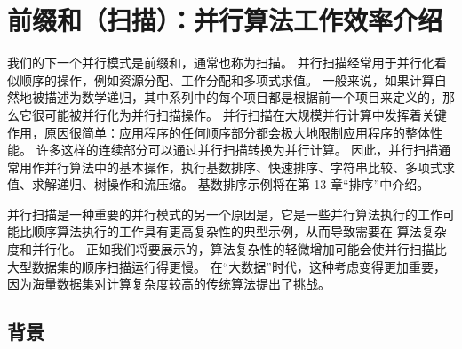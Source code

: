 \section{前缀和（扫描）：并行算法工作效率介绍}
我们的下一个并行模式是前缀和，通常也称为扫描。 并行扫描经常用于并行化看似顺序的操作，例如资源分配、工作分配和多项式求值。 一般来说，如果计算自然地被描述为数学递归，其中系列中的每个项目都是根据前一个项目来定义的，那么它很可能被并行化为并行扫描操作。 并行扫描在大规模并行计算中发挥着关键作用，原因很简单：应用程序的任何顺序部分都会极大地限制应用程序的整体性能。 许多这样的连续部分可以通过并行扫描转换为并行计算。 因此，并行扫描通常用作并行算法中的基本操作，执行基数排序、快速排序、字符串比较、多项式求值、求解递归、树操作和流压缩。 基数排序示例将在第 13 章“排序”中介绍。

并行扫描是一种重要的并行模式的另一个原因是，它是一些并行算法执行的工作可能比顺序算法执行的工作具有更高复杂性的典型示例，从而导致需要在 算法复杂度和并行化。 正如我们将要展示的，算法复杂性的轻微增加可能会使并行扫描比大型数据集的顺序扫描运行得更慢。 在“大数据”时代，这种考虑变得更加重要，因为海量数据集对计算复杂度较高的传统算法提出了挑战。

\subsection{背景}